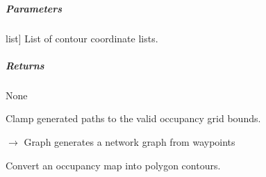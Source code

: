 \documentclass[letterpaper,10pt,english]{sphinxmanual}
\begin{document}
\begin{fulllineitems}
\begin{fulllineitems}
\subparagraph{Parameters}
\label{\detokenize{mirte_lc_nav2.navigator_types:id8}}\begin{description}
\sphinxlineitem{contours}{[}list{]}
\sphinxAtStartPar
List of contour coordinate lists.

\end{description}


\subparagraph{Returns}
\label{\detokenize{mirte_lc_nav2.navigator_types:id9}}
\sphinxAtStartPar
None

\end{fulllineitems}


\begin{fulllineitems}
\label{\detokenize{mirte_lc_nav2.navigator_types:mirte_lc_nav2.navigator_types.SystematicNavigator.sanitize_paths}}
\pysigstartsignatures
\pysiglinewithargsret
{}
{}
{}
\pysigstopsignatures
\sphinxAtStartPar
Clamp generated paths to the valid occupancy grid bounds.

\end{fulllineitems}


\begin{fulllineitems}
\label{\detokenize{mirte_lc_nav2.navigator_types:mirte_lc_nav2.navigator_types.SystematicNavigator.set_waypoints}}
\pysigstartsignatures
\pysiglinewithargsret
{}
{}
{{ $\rightarrow$ Graph}}
\pysigstopsignatures
\sphinxAtStartPar
generates a network graph from waypoints

\end{fulllineitems}


\begin{fulllineitems}
\label{\detokenize{mirte_lc_nav2.navigator_types:mirte_lc_nav2.navigator_types.SystematicNavigator.update_map}}
\pysigstartsignatures
\pysiglinewithargsret
{}
{}
{}
\pysigstopsignatures
\sphinxAtStartPar
Convert an occupancy map into polygon contours.


\end{fulllineitems}
\end{fulllineitems}
\end{document}
